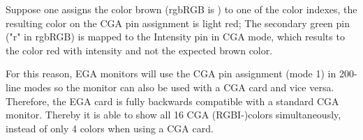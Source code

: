 \documentclass[book.tex]{subfiles}
\begin{document}
\pagebreak
Suppose one assigns the color brown (rgbRGB is ) to one of the color indexes, the resulting color on the CGA pin assignment is light red; The secondary green pin ("r" in rgbRGB) is mapped to the Intensity pin in CGA mode, which results to the color red with intensity and not the expected brown color. \\

\par
For this reason, EGA monitors will use the CGA pin assignment (mode 1) in 200-line modes so the monitor can also be used with a CGA card and vice versa. Therefore, the EGA card is fully backwards compatible with a standard CGA monitor. Thereby it is able to show all 16 CGA (RGBI-)colors simultaneously, instead of only 4 colors when using a CGA card.  \\
\end{document}
